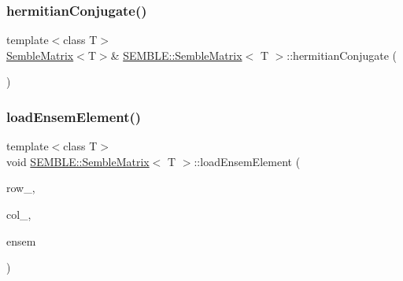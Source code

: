 \subsubsection{\texorpdfstring{hermitianConjugate()}{hermitianConjugate()}\hspace{0.1cm}{\footnotesize\ttfamily [2/2]}}
{\footnotesize\ttfamily template$<$class T$>$ \\
\mbox{\hyperlink{structSEMBLE_1_1SembleMatrix}{Semble\+Matrix}}$<$T$>$\& \mbox{\hyperlink{structSEMBLE_1_1SembleMatrix}{S\+E\+M\+B\+L\+E\+::\+Semble\+Matrix}}$<$ T $>$\+::hermitian\+Conjugate (\begin{DoxyParamCaption}\item[{void}]{ }\end{DoxyParamCaption})}

\mbox{\label{structSEMBLE_1_1SembleMatrix_a84fd4f9ffc4012e6e09faa054ed57908}} 
\subsubsection{\texorpdfstring{loadEnsemElement()}{loadEnsemElement()}\hspace{0.1cm}{\footnotesize\ttfamily [1/2]}}
{\footnotesize\ttfamily template$<$class T$>$ \\
void \mbox{\hyperlink{structSEMBLE_1_1SembleMatrix}{S\+E\+M\+B\+L\+E\+::\+Semble\+Matrix}}$<$ T $>$\+::load\+Ensem\+Element (\begin{DoxyParamCaption}\item[{int}]{row\+\_\+,  }\item[{int}]{col\+\_\+,  }\item[{const typename \mbox{\hyperlink{structSEMBLE_1_1PromoteEnsem}{Promote\+Ensem}}$<$ T $>$\+::Type \&}]{ensem }\end{DoxyParamCaption})}

\mbox{\label{structSEMBLE_1_1SembleMatrix_a84fd4f9ffc4012e6e09faa054ed57908}} 
